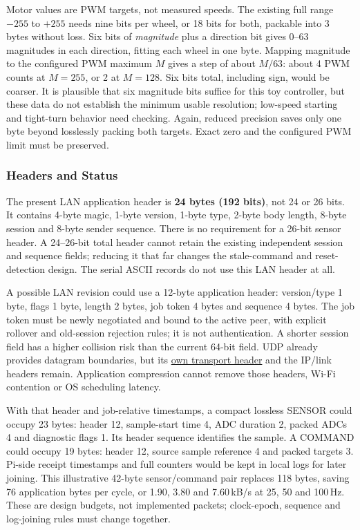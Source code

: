 Motor values are PWM targets, not measured speeds. The existing full range $-255$ to $+255$ needs nine bits per wheel, or 18 bits for both, packable into 3 bytes without loss. Six bits of \emph{magnitude} plus a direction bit gives 0--63 magnitudes in each direction, fitting each wheel in one byte. Mapping magnitude to the configured PWM maximum $M$ gives a step of about $M/63$: about 4 PWM counts at $M=255$, or 2 at $M=128$. Six bits total, including sign, would be coarser. It is plausible that six magnitude bits suffice for this toy controller, but these data do not establish the minimum usable resolution; low-speed starting and tight-turn behavior need checking. Again, reduced precision saves only one byte beyond losslessly packing both targets. Exact zero and the configured PWM limit must be preserved.

\subsubsection{Headers and Status}
The present LAN application header is \textbf{24 bytes (192 bits)}, not 24 or 26 bits. It contains 4-byte magic, 1-byte version, 1-byte type, 2-byte body length, 8-byte session and 8-byte sender sequence. There is no requirement for a 26-bit sensor header. A 24--26-bit total header cannot retain the existing independent session and sequence fields; reducing it that far changes the stale-command and reset-detection design. The serial ASCII records do not use this LAN header at all.

A possible LAN revision could use a 12-byte application header: version/type 1 byte, flags 1 byte, length 2 bytes, job token 4 bytes and sequence 4 bytes. The job token must be newly negotiated and bound to the active peer, with explicit rollover and old-session rejection rules; it is not authentication. A shorter session field has a higher collision risk than the current 64-bit field. UDP already provides datagram boundaries, but its \href{https://www.rfc-editor.org/rfc/rfc768}{own transport header} and the IP/link headers remain. Application compression cannot remove those headers, Wi-Fi contention or OS scheduling latency.

With that header and job-relative timestamps, a compact lossless SENSOR could occupy 23 bytes: header 12, sample-start time 4, ADC duration 2, packed ADCs 4 and diagnostic flags 1. Its header sequence identifies the sample. A COMMAND could occupy 19 bytes: header 12, source sample reference 4 and packed targets 3. Pi-side receipt timestamps and full counters would be kept in local logs for later joining. This illustrative 42-byte sensor/command pair replaces 118 bytes, saving 76 application bytes per cycle, or 1.90, 3.80 and 7.60\,kB/s at 25, 50 and 100\,Hz. These are design budgets, not implemented packets; clock-epoch, sequence and log-joining rules must change together.


